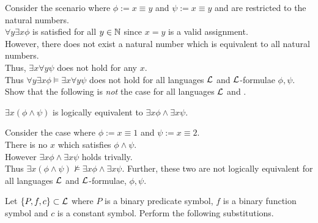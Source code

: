 \documentclass[11pt,a4paper]{article}
\begin{document}
\apart
Consider the scenario where $\phi:=x\equiv y$ and $\psi:=x\equiv y$ and are restricted to the natural numbers.\\
$\forall y\exists x\phi$ is satisfied for all $y\in\mathbb{N}$ since $x=y$ is a valid assignment.\\
However, there does not exist a natural number which is equivalent to all natural numbers.\\
Thus, $\exists x\forall y\psi$ does not hold for any $x$.\\
Thus $\forall y\exists x\phi\vDash\exists x\forall y\psi$ does not hold for all languages $\mathcal{L}$ and $\mathcal{L}$-formulae $\phi,\psi$.\\

\qpartnb Show that the following is \textit{not} the case for all languages $\mathcal{L}$ and .
\begin{center}
$\exists x(\phi\wedge\psi)$ is logically equivalent to $\exists x\phi\wedge\exists x\psi$.
\end{center}
\apart
Consider the case where $\phi:=x\equiv1$ and $\psi:=x\equiv2$.\\
There is no $x$ which satisfies $\phi\wedge\psi$.\\
However $\exists x\phi\wedge\exists x\psi$ holds trivally.\\
Thus $\exists x(\phi\wedge\psi)\not\vDash\exists x\phi\wedge\exists x \psi$.
Further, these two are not logically equivalent for all languages $\mathcal{L}$ and $\mathcal{L}$-formulae, $\phi,\psi$.

\setcounter{section}{4}
\question
Let $\{P,f,c\}\subset\mathcal{L}$ where $P$ is a binary predicate symbol, $f$ is a binary function symbol and $c$ is a constant symbol. Perform the following substitutions.\\
\end{document}
